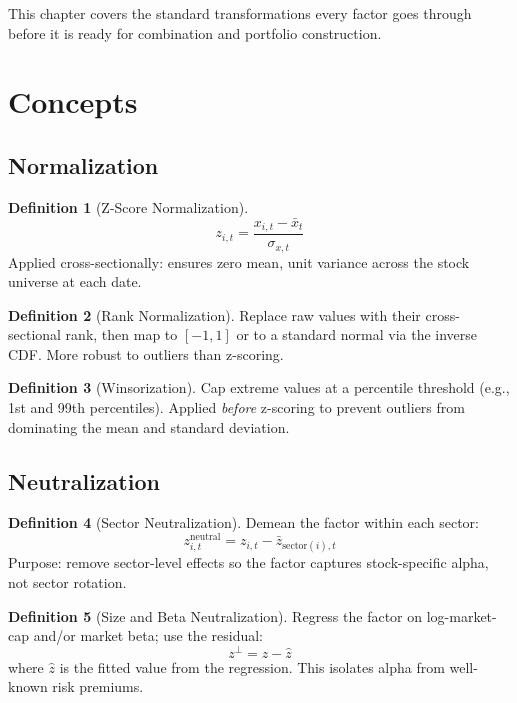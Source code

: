 \documentclass[a4paper, 11pt]{report}
\theoremstyle{definition}
\newtheorem{definition}{Definition}[chapter]
\theoremstyle{remark}
\begin{document}
This chapter covers the standard transformations every factor goes through
before it is ready for combination and portfolio construction.

\section{Concepts}

\subsection{Normalization}

\begin{definition}[Z-Score Normalization]
    \[
        z_{i,t} = \frac{x_{i,t} - \bar{x}_t}{\sigma_{x,t}}
    \]
    Applied cross-sectionally: ensures zero mean, unit variance across the
    stock universe at each date.
\end{definition}

\begin{definition}[Rank Normalization]
    Replace raw values with their cross-sectional rank, then map to $[-1, 1]$
    or to a standard normal via the inverse CDF\@.  More robust to outliers
    than z-scoring.
\end{definition}

\begin{definition}[Winsorization]
    Cap extreme values at a percentile threshold (e.g., 1st and 99th
    percentiles).  Applied \emph{before} z-scoring to prevent outliers from
    dominating the mean and standard deviation.
\end{definition}

\subsection{Neutralization}

\begin{definition}[Sector Neutralization]
    Demean the factor within each sector:
    \[
        z_{i,t}^{\text{neutral}} = z_{i,t} - \bar{z}_{\text{sector}(i),t}
    \]
    Purpose: remove sector-level effects so the factor captures stock-specific
    alpha, not sector rotation.
\end{definition}

\begin{definition}[Size and Beta Neutralization]
    Regress the factor on log-market-cap and/or market beta; use the residual:
    \[
        z^{\perp} = z - \hat{z}
    \]
    where $\hat{z}$ is the fitted value from the regression.  This isolates
    alpha from well-known risk premiums.
\end{definition}
\end{document}
